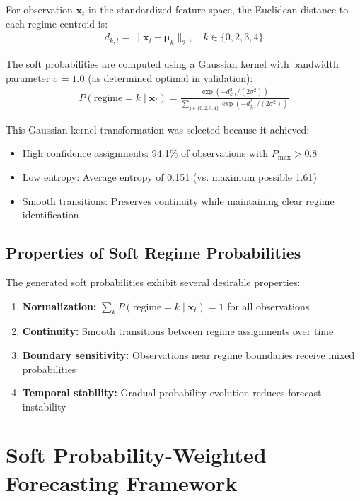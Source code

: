 For observation $\mathbf{x}_t$ in the standardized feature space, the Euclidean distance to each regime centroid is:
\begin{align}
d_{k,t} = \|\mathbf{x}_t - \boldsymbol{\mu}_k\|_2, \quad k \in \{0,2,3,4\}
\end{align}

The soft probabilities are computed using a Gaussian kernel with bandwidth parameter $\sigma=1.0$ (as determined optimal in validation):
\begin{align}
P(\text{regime}=k \mid \mathbf{x}_t) = \frac{\exp(-d_{k,t}^2 / (2\sigma^2))}{\sum_{j \in \{0,2,3,4\}} \exp(-d_{j,t}^2 / (2\sigma^2))}
\end{align}

This Gaussian kernel transformation was selected because it achieved:
\begin{itemize}
    \item High confidence assignments: 94.1\% of observations with $P_{\max} > 0.8$
    \item Low entropy: Average entropy of 0.151 (vs. maximum possible 1.61)
    \item Smooth transitions: Preserves continuity while maintaining clear regime identification
\end{itemize}

\subsection{Properties of Soft Regime Probabilities}

The generated soft probabilities exhibit several desirable properties:
\begin{enumerate}
    \item \textbf{Normalization:} $\sum_{k} P(\text{regime}=k \mid \mathbf{x}_t) = 1$ for all observations
    \item \textbf{Continuity:} Smooth transitions between regime assignments over time
    \item \textbf{Boundary sensitivity:} Observations near regime boundaries receive mixed probabilities
    \item \textbf{Temporal stability:} Gradual probability evolution reduces forecast instability
\end{enumerate}

\section{Soft Probability-Weighted Forecasting Framework}

